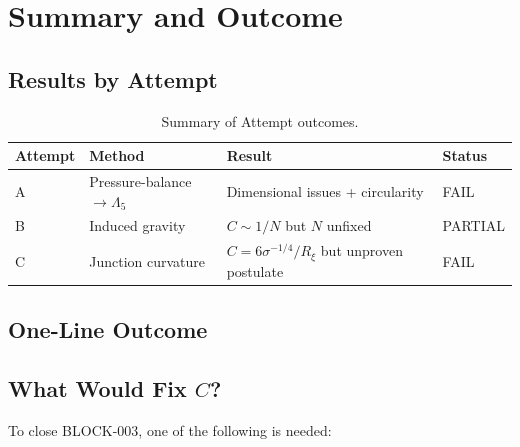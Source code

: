 \documentclass[11pt,a4paper]{article}
\theoremstyle{definition}
\begin{document}
\section{Summary and Outcome}
\label{sec:summary}

\subsection{Results by Attempt}

\begin{table}[h]
\centering
\begin{tabular}{llll}
\toprule
\textbf{Attempt} & \textbf{Method} & \textbf{Result} & \textbf{Status} \\
\midrule
A & Pressure-balance $\to \Lambda_5$ & Dimensional issues + circularity & FAIL \\
B & Induced gravity & $C \sim 1/N$ but $N$ unfixed & PARTIAL \\
C & Junction curvature & $C = 6\sigma^{-1/4}/R_\xi$ but unproven postulate & FAIL \\
\bottomrule
\end{tabular}
\caption{Summary of Attempt outcomes.}
\end{table}

\subsection{One-Line Outcome}

\begin{center}
\end{center}

\subsection{What Would Fix $C$?}

To close BLOCK-003, one of the following is needed:
\end{document}
